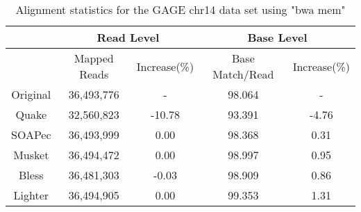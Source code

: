 \documentclass[10pt]{article}
\begin{document}
\begin{table}[h!] 
\caption{Alignment statistics for the GAGE chr14 data set using "bwa mem"}
\begin{tabular}{|c|c|c||c|c|} \hline
	 & \multicolumn{2}{|c||}{Read Level} & \multicolumn{2}{|c|}{Base Level} \\ \hline
     & Mapped Reads & Increase(\%) & Base Match/Read & Increase(\%) \\ \hline
Original&	36,493,776& - 	&	98.064&	- \\ \hline
Quake&	32,560,823&	-10.78&	93.391&	-4.76 \\ \hline
SOAPec&	36,493,999&	0.00&	98.368&	0.31 \\ \hline
Musket&	36,494,472&	0.00&	98.997&	0.95 \\ \hline
Bless&	36,481,303&	-0.03&	98.909&	0.86 \\ \hline
Lighter&	36,494,905&	0.00&	99.353&	1.31 \\ \hline
\end{tabular}
\end{table}

\clearpage



\end{document}

